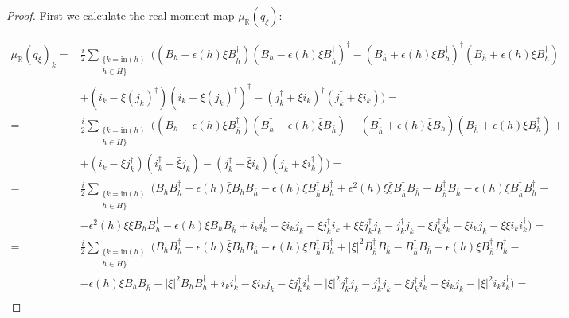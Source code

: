 \documentclass[12pt,oneside,reqno]{amsart}
\theoremstyle{definition}
\numberwithin{equation}{section}
\numberwithin{theorem}{section}
\newcommand{\R}{\mathbb{R}}
\renewcommand{\d}[1]{\ensuremath{\operatorname{d}\!{#1}}}
\renewcommand{\d}{\dagger}
\begin{document}
%
\begin{proof} First we calculate the real moment map $\mu_\R(q_\xi)$: 
   
\begin{equation*}
\begin{split}
\mu_\R(q_\xi)_k=&\frac{i}{2}\sum\limits_{\substack{\{k=\text{in}(h)\\ h\in H\}}} \Big((B_h-\epsilon(h)\xi B_{\bar{h}}^\dagger)(B_h-\epsilon(h)\xi B_{\bar{h}}^\dagger)^\dagger-(B_{\bar{h}}+\epsilon(h)\xi B_h^\dagger)^\dagger (B_{\bar{h}}+\epsilon(h)\xi B_h^\dagger) \\ 
&+(i_k-\xi (j_k)^\dagger)(i_k-\xi (j_k)^\dagger)^\dagger-(j_k^\dagger +\xi i_k)^\dagger(j_k^\dagger +\xi i_k)\Big)= \\
=& \frac{i}{2} \sum\limits_{\substack{\{k=\text{in}(h)\\ h\in H\}}} \Big((B_h-\epsilon(h)\xi B_{\bar{h}}^\dagger)(B_h^\dagger -\epsilon (h) \bar\xi B_{\bar{h}})-(B_{\bar{h}}^\dagger+\epsilon(h)\bar\xi B_h )(B_{\bar{h}}+\epsilon(h) \xi B_h^\dagger )+\\
&+(i_k -\xi j_k^\dagger)(i_k^\dagger-\bar\xi j_k) -(j_k^\dagger+\bar\xi i_k)(j_k +\xi i_k^\dagger)\Big)= \\
=& \frac{i}{2}\sum\limits_{\substack{\{k=\text{in}(h)\\ h\in H\}}} \Big(B_h B_h^\dagger -\epsilon(h)\bar \xi B_hB_{\bar{h}}-\epsilon(h)\xi B_{\bar{h}}^\dagger B_h^\dagger +\epsilon ^2 (h)\xi \bar \xi B_{\bar{h}}^\dagger B_{\bar{h}}-B_{\bar{h}}^\dagger B_{\bar h} - \epsilon (h) \xi B_{\bar{h}}^\dagger B_h ^\dagger - \\
&- \epsilon^2 (h)\xi \bar \xi  B_h B_h^\dagger -\epsilon (h) \bar \xi B_hB_{\bar h}+i_k i_k^\dagger -\bar \xi i_kj_k -\xi j_k^\dagger i_k^\dagger +\xi \bar \xi  j_k^\dagger j_k -j_k^\dagger j_k -\xi j_k^\dagger i_k^\dagger -\bar \xi i_k j_k -\xi \bar \xi i_k i_k^\dagger\Big)= \\
=& \frac{i}{2}\sum\limits_{\substack{\{k=\text{in}(h)\\ h\in H\}}} \Big(B_h B_h^\d -\epsilon (h) \bar \xi B_h B_{\bar{h}}-\epsilon (h)\xi B_{\bar{h}}^\dagger B_h ^\dagger +\lvert\xi\rvert ^2 B_{\bar{h}}^\dagger B_{\bar{h}} -B_{\bar{h}}^\dagger B_{\bar{h}}-\epsilon (h) \xi B_{\bar{h}}^\dagger B_h^\dagger - \\
&-\epsilon (h) \bar \xi B_h B_{\bar{h}}-\lvert\xi\rvert^2 B_h B_h^\dagger +i_k i_k^\d - \bar \xi i_kj_k -\xi j_k^\d i_k^\d +\lvert\xi\rvert ^2 j_k^\d j_k -j_k^\d j_k -\xi j_k^\d i_k^\d -\bar \xi i_kj_k -\lvert\xi\rvert^2 i_ki_k^\d \Big)= \\

\end{split}
\end{equation*}
\end{proof}
\end{document}
